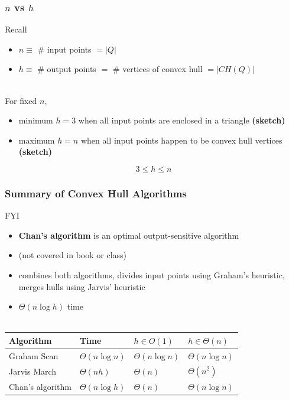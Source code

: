 \documentclass{beamer}
\newcommand{\stanza}{ \\~\ }
\begin{document}
\begin{frame} \frametitle{$n$ vs $h$}
  Recall
  \begin{itemize}
    \item $n \equiv $ \# input points $= |Q|$
    \item $h \equiv $ \# output points $=$ \# vertices of convex hull $= |CH(Q)|$
    \stanza
  \end{itemize}

  For fixed $n,$
  \begin{itemize}
    \item minimum $h = 3$ when all input points are enclosed in a triangle \textbf{(sketch)}
    \item maximum $h = n$ when all input points happen to be convex hull vertices \textbf{(sketch)}
  \end{itemize}

  \[ 3 \leq h \leq n \]

\end{frame}

\begin{frame} \frametitle{Summary of Convex Hull Algorithms}
  FYI
  \begin{itemize}
    \item \textbf{Chan's algorithm} is an optimal output-sensitive algorithm
    \item (not covered in book or class)
    \item combines both algorithms, divides input points using Graham's heuristic,
      merges hulls using Jarvis' heuristic
    \item $\Theta(n \log h)$ time \stanza
  \end{itemize}

\begin{center}
  \begin{tabular}{|l|l|l|l|}
    \hline
    \textbf{Algorithm} & \textbf{Time} & $h \in O(1)$ & $h \in \Theta(n)$ \\ \hline
    Graham Scan & $\Theta(n \log n)$ & $\Theta(n \log n)$ & $\Theta(n \log n)$ \\
    Jarvis March & $\Theta(nh)$ & $\Theta(n)$ & $\Theta(n^2)$ \\
    Chan's algorithm & $\Theta(n \log h)$ & $\Theta(n)$ & $\Theta(n \log n)$ \\
    \hline
  \end{tabular}
\end{center}

\end{frame}
\end{document}
